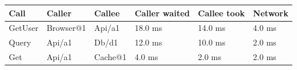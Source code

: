\begin{tabular}{@{}llllll@{}}
\toprule
Call & Caller & Callee & Caller waited & Callee took & Network \\
\midrule
GetUser & Browser@1 & Api/a1 & 18.0 ms & 14.0 ms & 4.0 ms \\
Query & Api/a1 & Db/d1 & 12.0 ms & 10.0 ms & 2.0 ms \\
Get & Api/a1 & Cache@1 & 4.0 ms & 2.0 ms & 2.0 ms \\
\bottomrule
\end{tabular}

